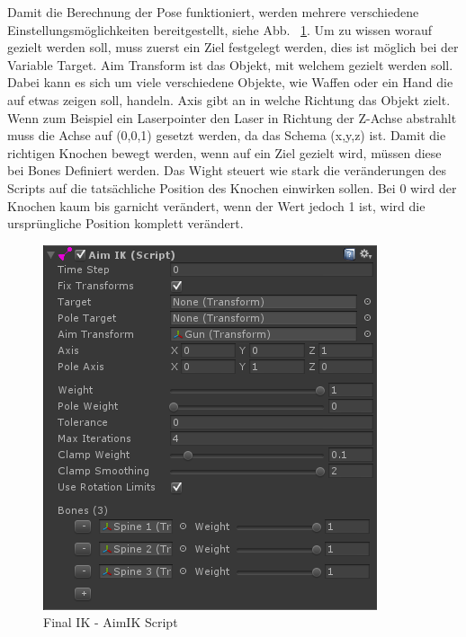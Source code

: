\begin{itemize}
Damit die Berechnung der Pose funktioniert, werden mehrere verschiedene Einstellungsmöglichkeiten bereitgestellt, siehe Abb. ~\ref{fig:finalIK_aimIK_script}.
Um zu wissen worauf gezielt werden soll, muss zuerst ein Ziel festgelegt werden, dies ist möglich bei der Variable Target.
Aim Transform ist das Objekt, mit welchem gezielt werden soll.
Dabei kann es sich um viele verschiedene Objekte, wie Waffen oder ein Hand die auf etwas zeigen soll, handeln.
Axis gibt an in welche Richtung das Objekt zielt.
Wenn zum Beispiel ein Laserpointer den Laser in Richtung der Z-Achse abstrahlt muss die Achse auf (0,0,1) gesetzt werden, da das Schema (x,y,z) ist.
Damit die richtigen Knochen bewegt werden, wenn auf ein Ziel gezielt wird, müssen diese bei Bones Definiert werden.
Das Wight steuert wie stark die veränderungen des Scripts auf die tatsächliche Position des Knochen einwirken sollen.
Bei 0 wird der Knochen kaum bis garnicht verändert, wenn der Wert jedoch 1 ist, wird die ursprüngliche Position komplett verändert.
\begin {figure}
    \centering
    \includegraphics[scale=0.7]{pics/finalik_aimik_script}
    \caption{Final IK - AimIK Script}
    \label{fig:finalIK_aimIK_script}
\end {figure}
~\cite{FinalIK_AimIK_2021}


\end{itemize}
